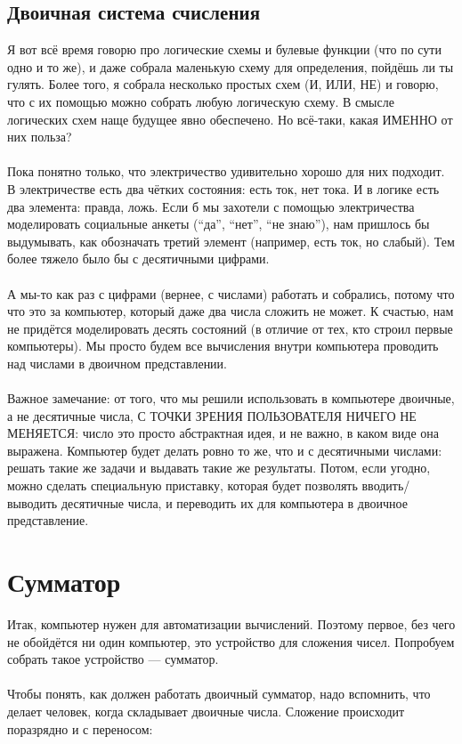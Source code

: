\documentclass[11pt]{book}
\begin{document}
\subsection{Двоичная система счисления}
Я вот всё время говорю про логические схемы и булевые функции (что по сути одно и то же),
и даже собрала маленькую схему для определения, пойдёшь ли ты гулять. Более того, я собрала
несколько простых схем (И, ИЛИ, НЕ) и говорю, что с их помощью можно собрать
любую логическую схему. В смысле логических схем наще будущее явно обеспечено.
Но всё-таки, какая ИМЕННО от них польза?
\\ \\
Пока понятно только, что электричество удивительно хорошо для них подходит.
В электричестве есть два чётких состояния: есть ток, нет тока. И в логике
есть два элемента: правда, ложь. Если б мы захотели с помощью электричества моделировать
социальные анкеты (``да'', ``нет'', ``не знаю''), нам пришлось бы выдумывать, как обозначать
третий элемент (например, есть ток, но слабый). Тем более тяжело было бы
с десятичными цифрами.
\\ \\
А мы-то как раз с цифрами (вернее, с числами) работать и собрались, потому что
что это за компьютер, который даже два числа сложить не может. К счастью, нам не
придётся моделировать десять состояний (в отличие от тех, кто строил первые
компьютеры). Мы просто будем все вычисления внутри компьютера проводить над числами
в двоичном представлении.
\\ \\
Важное замечание: от того, что мы решили использовать в компьютере двоичные,
а не десятичные числа, С ТОЧКИ ЗРЕНИЯ ПОЛЬЗОВАТЕЛЯ НИЧЕГО НЕ МЕНЯЕТСЯ: число
это просто абстрактная идея, и не важно, в каком виде она выражена. Компьютер
будет делать ровно то же, что и с десятичными числами: решать такие же задачи
и выдавать такие же результаты. Потом, если угодно, можно сделать специальную приставку,
которая будет позволять вводить/выводить десятичные числа, и переводить их
для компьютера в двоичное представление.

\section{Сумматор}
Итак, компьютер нужен для автоматизации вычислений.
Поэтому первое, без чего не обойдётся ни один компьютер, это устройство
для сложения чисел. Попробуем собрать такое устройство --- сумматор.
\\ \\
Чтобы понять, как должен работать двоичный сумматор, надо
вспомнить, что делает человек, когда складывает двоичные числа.
Сложение происходит поразрядно и с переносом:
\end{document}
